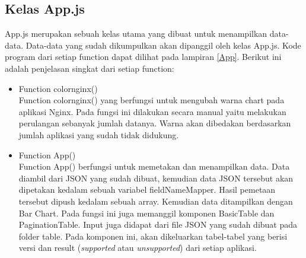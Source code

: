 \subsection{Kelas App.js}
App.js merupakan sebuah kelas utama yang dibuat untuk menampilkan data-data. Data-data yang sudah dikumpulkan akan dipanggil oleh kelas App.js. Kode program dari setiap function dapat dilihat pada lampiran \ref{App}. Berikut ini adalah penjelasan singkat dari setiap function: 
\begin{itemize}
	\item Function colornginx()\\
	Function colornginx() yang berfungsi untuk mengubah warna chart pada aplikasi Nginx. Pada fungsi ini dilakukan secara manual yaitu melakukan perulangan sebanyak jumlah datanya. Warna akan dibedakan berdasarkan jumlah aplikasi yang sudah tidak didukung.
	\item Function App()\\
	Function App() berfungsi untuk memetakan dan menampilkan data. Data diambil dari JSON yang sudah dibuat, kemudian data JSON tersebut akan dipetakan kedalam sebuah variabel fieldNameMapper. Hasil pemetaan tersebut dipush kedalam sebuah array. Kemudian data ditampilkan dengan Bar Chart. Pada fungsi ini juga memanggil komponen BasicTable  dan PaginationTable. Input juga didapat dari file JSON yang sudah dibuat pada folder table. Pada komponen ini, akan dikeluarkan tabel-tabel yang berisi versi dan result (\textit{supported} atau \textit{unsupported}) dari setiap aplikasi. 
\end{itemize}








